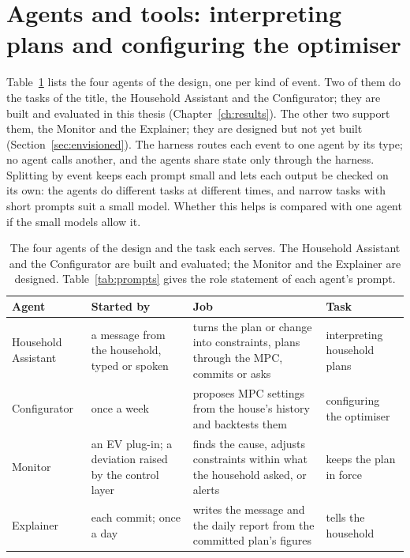 \documentclass[12pt,a4paper]{report}
\begin{document}
\section{Agents and tools: interpreting plans and configuring the optimiser}
\label{sec:agents}

Table~\ref{tab:agents} lists the four agents of the design, one per
kind of event. Two of them do the tasks of the title, the Household
Assistant and the Configurator; they are built and evaluated in this
thesis (Chapter~\ref{ch:results}). The other two support them, the
Monitor and the Explainer; they are designed but not yet built
(Section~\ref{sec:envisioned}). The harness routes each event
to one agent by its type; no agent calls another, and the agents share
state only through the harness. Splitting by event keeps each prompt
small and lets each output be checked on its own: the agents do
different tasks at different times, and narrow tasks with short prompts
suit a small model. Whether this helps is compared with one agent if the small
models allow it.

\begin{table}[htbp]
\caption{The four agents of the design and the task each serves. The
Household Assistant and the Configurator are built and evaluated; the
Monitor and the Explainer are designed. Table~\ref{tab:prompts}
gives the role statement of each agent's prompt.}
\label{tab:agents}
\small
\begin{tabularx}{\textwidth}{@{}>{\raggedright\arraybackslash}p{2.6cm}>{\raggedright\arraybackslash}p{2.9cm}X>{\raggedright\arraybackslash}p{2.4cm}@{}}
\toprule
Agent & Started by & Job & Task \\
\midrule
Household Assistant & a message from the household, typed or spoken & turns the plan or change into constraints, plans through the MPC, commits or asks & interpreting household plans \\
Configurator & once a week & proposes MPC settings from the house's history and backtests them & configuring the optimiser \\
Monitor & an EV plug-in; a deviation raised by the control layer & finds the cause, adjusts constraints within what the household asked, or alerts & keeps the plan in force \\
Explainer & each commit; once a day & writes the message and the daily report from the committed plan's figures & tells the household \\
\bottomrule
\end{tabularx}
\end{table}
\end{document}

